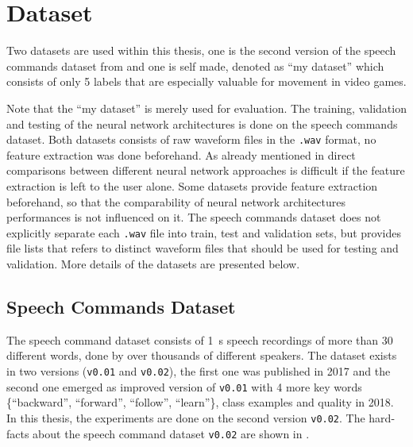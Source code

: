 
\section{Dataset}\label{sec:exp_dataset}
\thesisStateRevised
\thesisStateNotReady
\thesisStateReady
Two datasets are used within this thesis, one is the second version of the speech commands dataset from \cite{Warden2018} and one is self made, denoted as \enquote{my dataset} which consists of only 5 labels that are especially valuable for movement in video games.


Note that the \enquote{my dataset} is merely used for evaluation.
The training, validation and testing of the neural network architectures is done on the speech commands dataset.
Both datasets consists of raw waveform files in the \texttt{.wav} format, no feature extraction was done beforehand.
As already mentioned in  direct comparisons between different neural network approaches is difficult if the feature extraction is left to the user alone.
Some datasets provide feature extraction beforehand, so that the comparability of neural network architectures performances is not influenced on it.
The speech commands dataset does not explicitly separate each \texttt{.wav} file into train, test and validation sets, but provides file lists that refers to distinct waveform files that should be used for testing and validation.
More details of the datasets are presented below.




% 


\subsection{Speech Commands Dataset}\label{sec:exp_dataset_speech_cmd}
The speech command dataset \cite{Warden2018} consists of \SI{1}{\second} speech recordings of more than 30 different words, done by over thousands of different speakers.
The dataset exists in two versions (\texttt{v0.01} and \texttt{v0.02}), the first one was published in 2017 and the second one emerged as improved version of \texttt{v0.01} with 4 more key words \{\enquote{backward}, \enquote{forward}, \enquote{follow}, \enquote{learn}\}, class examples and quality in 2018.
In this thesis, the experiments are done on the second version \texttt{v0.02}.
The hard-facts about the speech command dataset \texttt{v0.02} are shown in .

